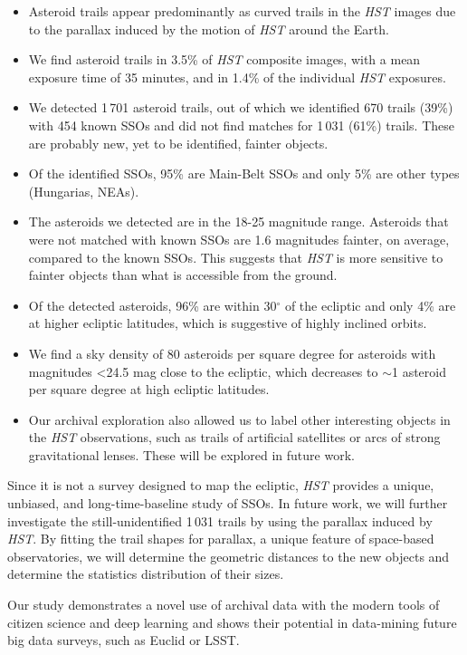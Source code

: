 \documentclass{aa}
\begin{document}
\begin{itemize}
    \item Asteroid trails appear predominantly as curved trails in the \textit{HST} images due to the parallax induced by the motion of \textit{HST} around the Earth.
    \item We find asteroid trails in 3.5\% of \textit{HST} composite images, with a mean exposure time of 35 minutes, and in 1.4\% of the individual \textit{HST} exposures. 
    \item We detected 1\,701 asteroid trails, out of which we identified 670 trails (39\%) with 454 known SSOs and did not find matches for 1\,031 (61\%) trails. These are probably new, yet to be identified, fainter objects. 
    \item Of the identified SSOs, 95\% are Main-Belt SSOs and only 5\% are other types (Hungarias, NEAs).
    \item The asteroids we detected are in the 18-25 magnitude range. Asteroids that were not matched with known SSOs are 1.6 magnitudes fainter, on average, compared to the known SSOs. This suggests that \textit{HST} is more sensitive to fainter objects than what is accessible from the ground.  
    \item Of the detected asteroids, 96\% are within 30$^{\circ}$ of the ecliptic and only 4\% are at higher ecliptic latitudes, which is suggestive of highly inclined orbits. 
    \item We find a sky density of 80 asteroids per square degree for asteroids with magnitudes <24.5 mag close to the ecliptic, which decreases to $\sim$1 asteroid per square degree at high ecliptic latitudes. 
    \item Our archival exploration also allowed us to label other interesting objects in the \textit{HST} observations, such as trails of artificial satellites or arcs of strong gravitational lenses. These will be explored in future work. 
\end{itemize}

Since it is not a survey designed to map the ecliptic, \textit{HST} provides a unique, unbiased, and long-time-baseline study of SSOs. In future work, we will further investigate the still-unidentified  1\,031 trails by using the parallax induced by \textit{HST}. By fitting the trail shapes for parallax, a unique feature of space-based observatories, we will determine the geometric distances to the new objects and determine the statistics distribution of their sizes. 

Our study demonstrates a novel use of archival data with the modern tools of citizen science and deep learning and shows their potential in data-mining future big data surveys, such as Euclid or LSST.
\end{document}
